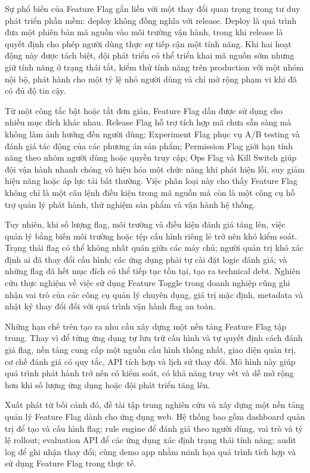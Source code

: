 \documentclass[11pt]{report}
\begin{document}
Sự phổ biến của Feature Flag gắn liền với một thay đổi quan trọng trong tư duy phát triển phần mềm: deploy không đồng nghĩa với release. Deploy là quá trình đưa một phiên bản mã nguồn vào môi trường vận hành, trong khi release là quyết định cho phép người dùng thực sự tiếp cận một tính năng. Khi hai hoạt động này được tách biệt, đội phát triển có thể triển khai mã nguồn sớm nhưng giữ tính năng ở trạng thái tắt, kiểm thử tính năng trên production với một nhóm nội bộ, phát hành cho một tỷ lệ nhỏ người dùng và chỉ mở rộng phạm vi khi đã có đủ độ tin cậy.

Từ một công tắc bật hoặc tắt đơn giản, Feature Flag dần được sử dụng cho nhiều mục đích khác nhau. Release Flag hỗ trợ tích hợp mã chưa sẵn sàng mà không làm ảnh hưởng đến người dùng; Experiment Flag phục vụ A/B testing và đánh giá tác động của các phương án sản phẩm; Permission Flag giới hạn tính năng theo nhóm người dùng hoặc quyền truy cập; Ops Flag và Kill Switch giúp đội vận hành nhanh chóng vô hiệu hóa một chức năng khi phát hiện lỗi, suy giảm hiệu năng hoặc áp lực tải bất thường. Việc phân loại này cho thấy Feature Flag không chỉ là một câu lệnh điều kiện trong mã nguồn mà còn là một công cụ hỗ trợ quản lý phát hành, thử nghiệm sản phẩm và vận hành hệ thống. \cite{fowler_feature_toggles}

Tuy nhiên, khi số lượng flag, môi trường và điều kiện đánh giá tăng lên, việc quản lý bằng biến môi trường hoặc tệp cấu hình riêng lẻ trở nên khó kiểm soát. Trạng thái flag có thể không nhất quán giữa các máy chủ; người quản trị khó xác định ai đã thay đổi cấu hình; các ứng dụng phải tự cài đặt logic đánh giá; và những flag đã hết mục đích có thể tiếp tục tồn tại, tạo ra technical debt. Nghiên cứu thực nghiệm về việc sử dụng Feature Toggle trong doanh nghiệp cũng ghi nhận vai trò của các công cụ quản lý chuyên dụng, giá trị mặc định, metadata và nhật ký thay đổi đối với quá trình vận hành flag an toàn.

Những hạn chế trên tạo ra nhu cầu xây dựng một nền tảng Feature Flag tập trung. Thay vì để từng ứng dụng tự lưu trữ cấu hình và tự quyết định cách đánh giá flag, nền tảng cung cấp một nguồn cấu hình thống nhất, giao diện quản trị, cơ chế đánh giá có quy tắc, API tích hợp và lịch sử thay đổi. Mô hình này giúp quá trình phát hành trở nên có kiểm soát, có khả năng truy vết và dễ mở rộng hơn khi số lượng ứng dụng hoặc đội phát triển tăng lên.

Xuất phát từ bối cảnh đó, đề tài tập trung nghiên cứu và xây dựng một nền tảng quản lý Feature Flag dành cho ứng dụng web. Hệ thống bao gồm dashboard quản trị để tạo và cấu hình flag; rule engine để đánh giá theo người dùng, vai trò và tỷ lệ rollout; evaluation API để các ứng dụng xác định trạng thái tính năng; audit log để ghi nhận thay đổi; cùng demo app nhằm minh họa quá trình tích hợp và sử dụng Feature Flag trong thực tế.
\end{document}
